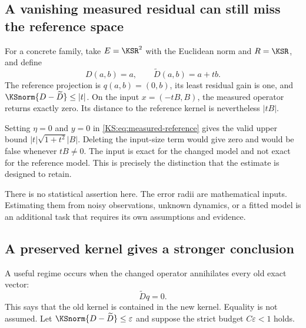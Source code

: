 \subsection{A vanishing measured residual can still miss the reference space}
For a concrete family, take \(E=\KSR^2\) with the Euclidean norm and \(R=\KSR\), and define
\[
 D(a,b)=a,\qquad \widetilde D(a,b)=a+tb.
\]
The reference projection is \(q(a,b)=(0,b)\), its least residual gain is one, and \(\KSnorm{D-\widetilde D}\le|t|\). On the input \(x=(-tB,B)\), the measured operator returns exactly zero. Its distance to the reference kernel is nevertheless \(|tB|\).

Setting \(\eta=0\) and \(y=0\) in \eqref{KS:eq:measured-reference} gives the valid upper bound \(|t|\sqrt{1+t^2}|B|\). Deleting the input-size term would give zero and would be false whenever \(tB\ne0\). The input is exact for the changed model and not exact for the reference model. This is precisely the distinction that the estimate is designed to retain.

There is no statistical assertion here. The error radii are mathematical inputs. Estimating them from noisy observations, unknown dynamics, or a fitted model is an additional task that requires its own assumptions and evidence.

\subsection{A preserved kernel gives a stronger conclusion}
A useful regime occurs when the changed operator annihilates every old exact vector:
\[
 \widetilde D q=0.
\]
This says that the old kernel is contained in the new kernel. Equality is not assumed. Let \(\KSnorm{D-\widetilde D}\le\varepsilon\) and suppose the strict budget \(C\varepsilon<1\) holds.

